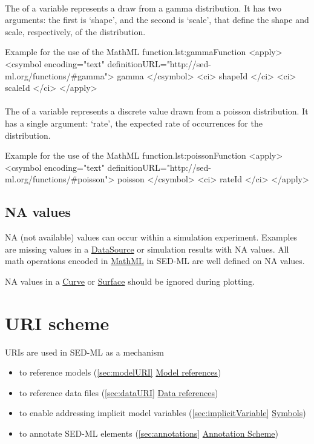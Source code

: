\paragraph*{}
\label{fun:gamma}
The \sedgamma of a variable represents a draw from a gamma distribution.  It has two arguments:  the first is `shape', and the second is `scale', that define the shape and scale, respectively, of the distribution.
\begin{myXmlLst}{Example for the use of the MathML  function.}{lst:gammaFunction}
<apply>
 	<csymbol encoding="text" definitionURL="http://sed-ml.org/functions/#gamma">
 		gamma
 	</csymbol>
 	<ci> shapeId </ci>
 	<ci> scaleId </ci>
</apply>
\end{myXmlLst}

\paragraph*{}
\label{fun:poisson}
The \poisson of a variable represents a discrete value drawn from a poisson distribution.  It has a single argument:  `rate', the expected rate of occurrences for the distribution.
\begin{myXmlLst}{Example for the use of the MathML  function.}{lst:poissonFunction}
<apply>
 	<csymbol encoding="text" definitionURL="http://sed-ml.org/functions/#poisson">
 		poisson
 	</csymbol>
 	<ci> rateId </ci>
</apply>
\end{myXmlLst}



\subsection{NA values}
NA (not available) values can occur within a simulation experiment. Examples are missing values in a \hyperref[class:dataSource]{DataSource} or simulation results with NA values. All math operations encoded in \hyperref[sec:mathML]{MathML} in SED-ML are well defined on NA values. 

NA values in a \hyperref[class:curve]{Curve} or \hyperref[class:surface]{Surface} should be ignored during plotting.
  
\section{URI scheme}  
\label{sec:uriScheme}
URIs are used in SED-ML as a mechanism
\begin{itemize}
	\item to reference models (\ref{sec:modelURI} \hyperref[sec:modelURI]{Model references})
	\item to reference data files (\ref{sec:dataURI} \hyperref[sec:dataURI]{Data references})
	\item to enable addressing implicit model variables (\ref{sec:implicitVariable}  \hyperref[sec:implicitVariable]{Symbols})
	\item to annotate SED-ML elements (\ref{sec:annotations}  \hyperref[sec:annotations]{Annotation Scheme})
\end{itemize}

